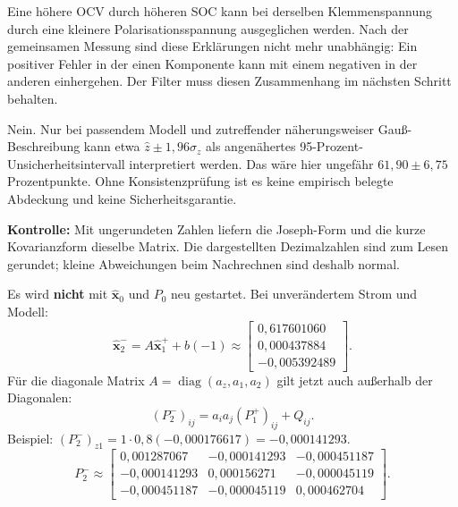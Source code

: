 Eine höhere OCV durch höheren SOC kann bei derselben Klemmenspannung durch eine kleinere Polarisationsspannung ausgeglichen werden. Nach der gemeinsamen Messung sind diese Erklärungen nicht mehr unabhängig: Ein positiver Fehler in der einen Komponente kann mit einem negativen in der anderen einhergehen. Der Filter muss diesen Zusammenhang im nächsten Schritt behalten.

Nein. Nur bei passendem Modell und zutreffender näherungsweiser Gauß-Beschreibung kann etwa $\hat z\pm1{,}96\sigma_z$ als angenähertes 95-Prozent-Unsicherheitsintervall interpretiert werden. Das wäre hier ungefähr $61{,}90\pm6{,}75$ Prozentpunkte. Ohne Konsistenzprüfung ist es keine empirisch belegte Abdeckung und keine Sicherheitsgarantie.

\textbf{Kontrolle:} Mit ungerundeten Zahlen liefern die Joseph-Form und die kurze Kovarianzform dieselbe Matrix. Die dargestellten Dezimalzahlen sind zum Lesen gerundet; kleine Abweichungen beim Nachrechnen sind deshalb normal.

Es wird \textbf{nicht} mit $\hat{\mathbf x}_0$ und $P_0$ neu gestartet. Bei unverändertem Strom und Modell:
\[
\hat{\mathbf x}_2^-=A\hat{\mathbf x}_1^++b(-1)
\approx\begin{bmatrix}0{,}617601060\\0{,}000437884\\-0{,}005392489\end{bmatrix}.
\]
Für die diagonale Matrix $A=\operatorname{diag}(a_z,a_1,a_2)$ gilt jetzt auch außerhalb der Diagonalen:
\[
(P_2^-)_{ij}=a_ia_j(P_1^+)_{ij}+Q_{ij}.
\]
Beispiel: $(P_2^-)_{z1}=1\cdot0{,}8(-0{,}000176617)=-0{,}000141293$.
\[
P_2^-\approx\begin{bmatrix}
0{,}001287067&-0{,}000141293&-0{,}000451187\\
-0{,}000141293&0{,}000156271&-0{,}000045119\\
-0{,}000451187&-0{,}000045119&0{,}000462704
\end{bmatrix}.
\]

